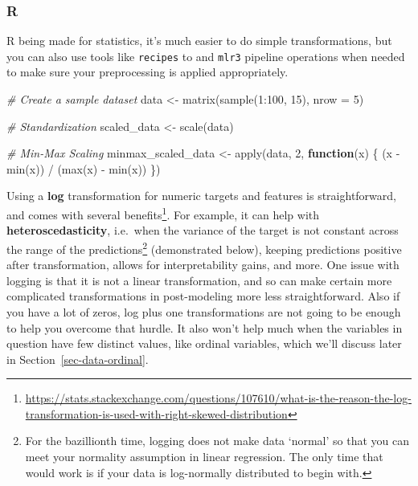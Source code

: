 \documentclass[
  letterpaper,
]{krantz}
\newenvironment{Shaded}{}{}
\newcommand{\AttributeTok}[1]{\textcolor[rgb]{0.49,0.56,0.16}{#1}}
\newcommand{\CommentTok}[1]{\textcolor[rgb]{0.38,0.63,0.69}{\textit{#1}}}
\newcommand{\ControlFlowTok}[1]{\textcolor[rgb]{0.00,0.44,0.13}{\textbf{#1}}}
\newcommand{\DecValTok}[1]{\textcolor[rgb]{0.25,0.63,0.44}{#1}}
\newcommand{\FunctionTok}[1]{\textcolor[rgb]{0.02,0.16,0.49}{#1}}
\newcommand{\NormalTok}[1]{#1}
\newcommand{\OtherTok}[1]{\textcolor[rgb]{0.00,0.44,0.13}{#1}}
\newcommand{\SpecialCharTok}[1]{\textcolor[rgb]{0.25,0.44,0.63}{#1}}
\DeclareRobustCommand{\href}[2]{#2\footnote{\url{#1}}}
\begin{document}
\subsubsection{R}

R being made for statistics, it's much easier to do simple
transformations, but you can also use tools like \texttt{recipes} to and
\texttt{mlr3} pipeline operations when needed to make sure your
preprocessing is applied appropriately.

\begin{Shaded}
\begin{Highlighting}[]
\CommentTok{\# Create a sample dataset}
\NormalTok{data }\OtherTok{\textless{}{-}} \FunctionTok{matrix}\NormalTok{(}\FunctionTok{sample}\NormalTok{(}\DecValTok{1}\SpecialCharTok{:}\DecValTok{100}\NormalTok{, }\DecValTok{15}\NormalTok{), }\AttributeTok{nrow =} \DecValTok{5}\NormalTok{)}

\CommentTok{\# Standardization}
\NormalTok{scaled\_data }\OtherTok{\textless{}{-}} \FunctionTok{scale}\NormalTok{(data)}

\CommentTok{\# Min{-}Max Scaling}
\NormalTok{minmax\_scaled\_data }\OtherTok{\textless{}{-}} \FunctionTok{apply}\NormalTok{(data, }\DecValTok{2}\NormalTok{, }\ControlFlowTok{function}\NormalTok{(x) \{}
\NormalTok{    (x }\SpecialCharTok{{-}} \FunctionTok{min}\NormalTok{(x)) }\SpecialCharTok{/}\NormalTok{ (}\FunctionTok{max}\NormalTok{(x) }\SpecialCharTok{{-}} \FunctionTok{min}\NormalTok{(x))}
\NormalTok{\})}
\end{Highlighting}
\end{Shaded}

Using a \textbf{log} transformation for numeric targets and features is
straightforward, and
\href{https://stats.stackexchange.com/questions/107610/what-is-the-reason-the-log-transformation-is-used-with-right-skewed-distribution}{comes
with several benefits}. For example, it can help with
\textbf{heteroscedasticity}, i.e.~when the variance of the target is not
constant across the range of the predictions\footnote{For the
  bazillionth time, logging does not make data `normal' so that you can
  meet your normality assumption in linear regression. The only time
  that would work is if your data is log-normally distributed to begin
  with.} (demonstrated below), keeping predictions positive after
transformation, allows for interpretability gains, and more. One issue
with logging is that it is not a linear transformation, and so can make
certain more complicated transformations in post-modeling more less
straightforward. Also if you have a lot of zeros, log plus one
transformations are not going to be enough to help you overcome that
hurdle. It also won't help much when the variables in question have few
distinct values, like ordinal variables, which we'll discuss later in
Section~\ref{sec-data-ordinal}.
\end{document}
